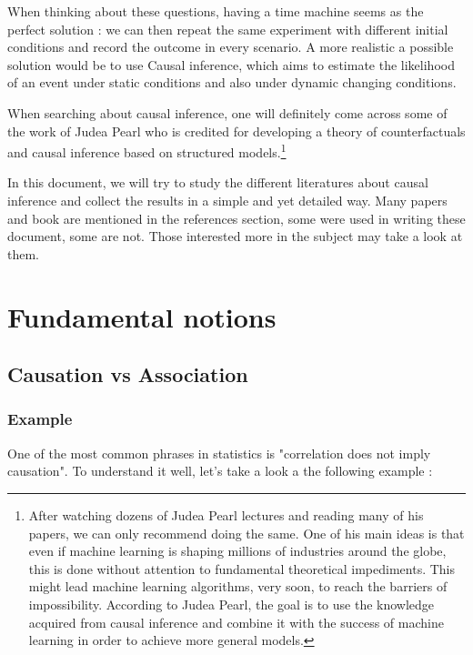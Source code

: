\documentclass{article}
\begin{document}
When thinking about these questions, having a time machine seems as the perfect solution : we can then repeat the same experiment with different initial conditions and record the outcome in every scenario. A more realistic a possible solution would be to use Causal inference, which aims to estimate the likelihood of an event under static conditions and also under dynamic changing conditions.

When searching about causal inference, one will definitely come across some of the work of Judea Pearl who is credited for developing a theory of counterfactuals and causal inference based on structured models.\footnote{After watching dozens of Judea Pearl lectures and reading many of his papers, we can only recommend doing the same. One of his main ideas is that even if machine learning is shaping millions of industries around the globe, this is done without attention to fundamental theoretical impediments. This might lead machine learning algorithms, very soon, to reach the barriers of impossibility. According to Judea Pearl, the goal is to use the knowledge acquired from causal inference and combine it with the success of machine learning in order to achieve more general models.}

In this document, we will try to study the different literatures about causal inference and collect the results in a simple and yet detailed way. Many papers and book are mentioned in the references section, some were used in writing these document, some are not. Those interested more in the subject may take a look at them.  


\newpage


\section{Fundamental notions}




\subsection{Causation vs Association}

	\subsubsection{Example}

One of the most common phrases in statistics is "correlation does not imply causation". To understand it well, let's take a look a the following example :
\end{document}
